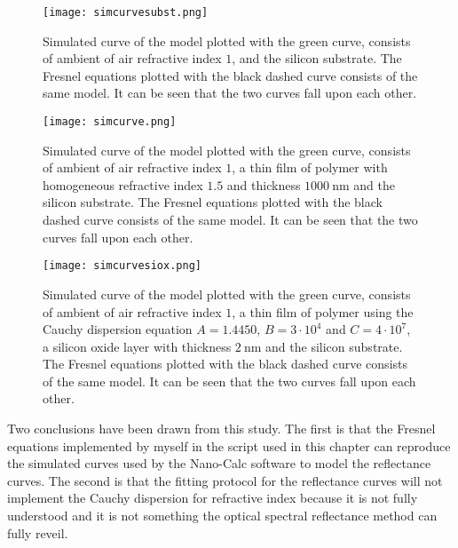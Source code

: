 \documentclass[MasterThesisMain.tex]{subfiles}
\begin{document}
\begin{figure}
\centering
\texttt{[image: simcurvesubst.png]}
\caption{Simulated curve of the model plotted with the green curve, consists of ambient of air refractive index $1$, and the silicon substrate. The Fresnel equations plotted with the black dashed curve consists of the same model. It can be seen that the two curves fall upon each other.}
\label{fig:simmodelsubst}
\end{figure}

\begin{figure}
\centering
\texttt{[image: simcurve.png]}
\caption{Simulated curve of the model plotted with the green curve, consists of ambient of air refractive index $1$, a thin film of polymer with homogeneous refractive index $1.5$ and thickness $\SI{1000}{\nano\meter}$ and the silicon substrate. The Fresnel equations plotted with the black dashed curve consists of the same model. It can be seen that the two curves fall upon each other.}
\label{fig:simmodel1}
\end{figure}

\begin{figure}
\centering
\texttt{[image: simcurvesiox.png]}
\caption{Simulated curve of the model plotted with the green curve, consists of ambient of air refractive index $1$, a thin film of polymer using the Cauchy dispersion equation $A=1.4450$, $B=3 \cdot 10^4$ and $C=4 \cdot 10^7$, a silicon oxide layer with thickness $\SI{2}{\nano\meter}$ and the silicon substrate. The Fresnel equations plotted with the black dashed curve consists of the same model. It can be seen that the two curves fall upon each other.}
\label{fig:simmodel2}
\end{figure}

Two conclusions have been drawn from this study. The first is that the Fresnel equations implemented by myself in the script used in this chapter can reproduce the simulated curves used by the Nano-Calc software to model the reflectance curves. The second is that the fitting protocol for the reflectance curves will not implement the Cauchy dispersion for refractive index because it is not fully understood and it is not something the optical spectral reflectance method can fully reveil.    
	
\end{document}
